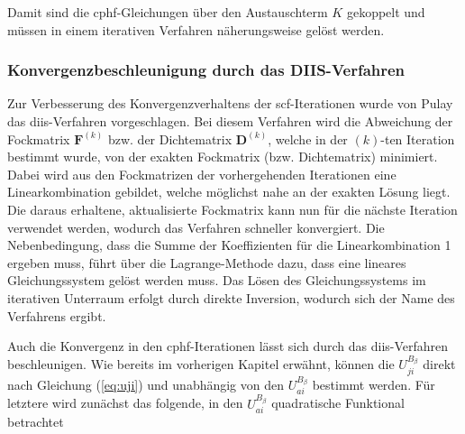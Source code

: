     Damit sind die \ac{cphf}-Gleichungen über den Austauschterm $K$ gekoppelt und müssen in einem iterativen Verfahren näherungsweise gelöst werden.
    
    \subsubsection{Konvergenzbeschleunigung durch das DIIS-Verfahren}
    Zur Verbesserung des Konvergenzverhaltens der \ac{scf}-Iterationen wurde von Pulay das \ac{diis}-Verfahren vorgeschlagen.\supercite{pulay1980convergence,pulay1982improved} Bei diesem Verfahren wird die Abweichung der Fockmatrix $\boldsymbol{F}^{(k)}$ bzw. der Dichtematrix $\boldsymbol{D}^{(k)}$, welche in der $(k)$-ten Iteration bestimmt wurde, von der exakten Fockmatrix (bzw. Dichtematrix) minimiert. Dabei wird aus den Fockmatrizen der vorhergehenden Iterationen eine Linearkombination gebildet, welche möglichst nahe an der exakten Lösung liegt. Die daraus erhaltene, aktualisierte Fockmatrix kann nun für die nächste Iteration verwendet werden, wodurch das Verfahren schneller konvergiert. Die Nebenbedingung, dass die Summe der Koeffizienten für die Linearkombination 1 ergeben muss, führt über die Lagrange-Methode dazu, dass eine lineares Gleichungssystem gelöst werden muss. Das Lösen des Gleichungssystems im iterativen Unterraum erfolgt durch direkte Inversion, wodurch sich der Name des Verfahrens ergibt.
    
    Auch die Konvergenz in den \ac{cphf}-Iterationen lässt sich durch das \ac{diis}-Verfahren beschleunigen. Wie bereits im vorherigen Kapitel erwähnt, können die $U_{ji}^{B_\beta}$ direkt nach Gleichung (\ref{eq:uji}) und unabhängig von den $U_{ai}^{B_\beta}$ bestimmt werden. Für letztere wird zunächst das folgende, in den $U_{ai}^{B_\beta}$ quadratische Funktional betrachtet
    
